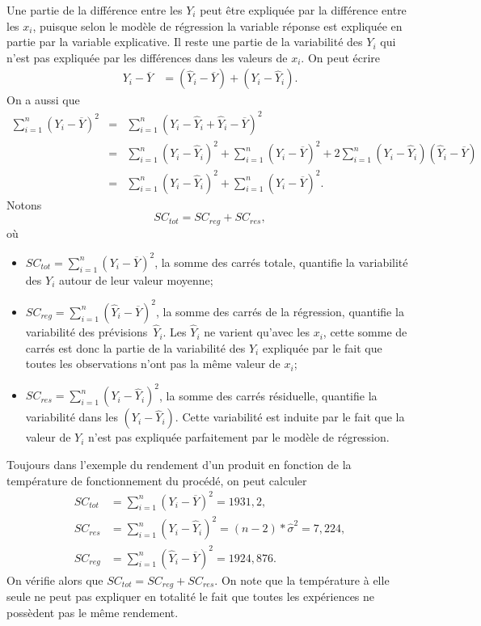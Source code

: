 Une partie de la différence entre les $Y_i$ peut être expliquée par la différence entre les $x_i$, puisque selon le modèle de régression la variable réponse est expliquée en partie par la variable explicative. Il reste une partie de la variabilité des $Y_i$ qui n'est pas expliquée par les différences dans les valeurs de $x_i$. On peut écrire
\begin{align*}
Y_i - \overline{Y} &= \left(\widehat{Y}_i - \overline{Y}\right)  +  \left(Y_i - \widehat{Y}_i\right).
\end{align*}
On a aussi que
\begin{eqnarray*}
  \sum_{i=1}^n \left(Y_i-\overline{Y}\right)^2 & = & \sum_{i=1}^n \left(Y_i - \widehat{Y}_i + \widehat{Y}_i - \overline{Y}\right)^2\\
 &=&  \sum_{i=1}^n \left(Y_i - \widehat{Y}_i\right)^2 + \sum_{i=1}^n\left(\widehat{Y}_i - \overline{Y}\right)^2 + 2\sum_{i=1}^n \left(Y_i-\widehat{Y}_i\right)\left(\widehat{Y}_i-\overline{Y}\right)\\
 &=&  \sum_{i=1}^n \left(Y_i - \widehat{Y}_i\right)^2 + \sum_{i=1}^n\left(\widehat{Y}_i - \overline{Y}\right)^2.
\end{eqnarray*}
Notons
\begin{equation}\label{eq:decompvar}
SC_{tot}=SC_{reg}+SC_{res},
\end{equation}
o\`u
\begin{itemize}
    \item $SC_{tot} =\sum_{i=1}^n(Y_i-\overline{Y})^2$, la somme des carrés totale, quantifie la variabilit\'e des $Y_i$ autour de leur valeur moyenne;
    \item $SC_{reg} =\sum_{i=1}^n(\widehat{Y}_i-\overline{Y})^2$, la somme des carrés de la régression, quantifie la variabilit\'e des prévisions~$\widehat{Y}_i$. Les $\widehat{Y}_i$ ne varient qu'avec les $x_i$, cette somme de carrés est donc la partie de la variabilit\'e des $Y_i$ expliqu\'ee par le fait que toutes les observations n'ont pas la m\^eme valeur de $x_i$;
    \item $SC_{res} =\sum_{i=1}^n(Y_i-\widehat{Y}_i)^2$, la somme des carrés résiduelle, quantifie la variabilit\'e dans les $(Y_i-\widehat{Y}_i)$. Cette variabilit\'e est induite par le fait que la valeur de $Y_i$ n'est pas expliqu\'ee parfaitement par le mod\`ele de r\'egression.
\end{itemize}

\begin{exemple}
\label{exp:ss}
Toujours dans l'exemple du rendement d'un produit en fonction de la température de fonctionnement du procédé, on peut calculer 
\begin{align*}
SC_{tot} &= \sum_{i=1}^n(Y_i-\overline{Y})^2 = 1931,2, \\
SC_{res} &= \sum_{i=1}^n(Y_i-\widehat{Y}_i)^2 = (n-2)*\widehat\sigma^2 = 7,224, \\
SC_{reg} &= \sum_{i=1}^n(\widehat{Y}_i-\overline{Y})^2 = 1924,876.
\end{align*}
On vérifie alors que $SC_{tot} = SC_{reg} + SC_{res}$. On note que la température \`a elle seule ne peut pas expliquer en totalit\'e le fait que toutes les expériences ne possèdent pas le m\^eme rendement.
\end{exemple}

